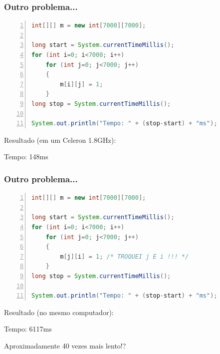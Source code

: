 \documentclass{beamer}
\begin{document}
\begin{frame}[fragile] %
\frametitle{Outro problema...}

\hfill\begin{minipage}{0.95\textwidth}
\begin{lstlisting}[language=Java,numbers=left]
int[][] m = new int[7000][7000];

long start = System.currentTimeMillis();
for (int i=0; i<7000; i++)
    for (int j=0; j<7000; j++)
    {
        m[i][j] = 1;
    }
long stop = System.currentTimeMillis();

System.out.println("Tempo: " + (stop-start) + "ms");\end{lstlisting}
\end{minipage}

\vspace{12pt}

Resultado {\footnotesize (em um Celeron 1.8GHz)}:

\pause

\begin{semiverbatim}
Tempo: 148ms
\end{semiverbatim}

\phantom{Aproximadamente 40 vezes mais lento!?}

\end{frame}

\begin{frame}[fragile] %
\frametitle{Outro problema...}

\hfill\begin{minipage}{0.95\textwidth}
\begin{lstlisting}[language=Java,numbers=left]
int[][] m = new int[7000][7000];

long start = System.currentTimeMillis();
for (int i=0; i<7000; i++)
    for (int j=0; j<7000; j++)
    {
        m[j][i] = 1; /* TROQUEI j E i !!! */
    }
long stop = System.currentTimeMillis();

System.out.println("Tempo: " + (stop-start) + "ms");\end{lstlisting}
\end{minipage}

\vspace{12pt}

Resultado {\footnotesize (no mesmo computador)}:

\pause

\begin{semiverbatim}
Tempo: 6117ms
\end{semiverbatim}

Aproximadamente 40 vezes mais lento!?

\end{frame}
\end{document}
